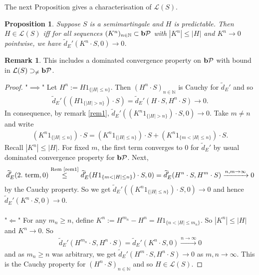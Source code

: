 \documentclass[12pt,a4paper, twoside]{article}
\newtheorem{prop}{Proposition}[section]
\theoremstyle{definition}
\newtheorem{rem}{Remark}[section]
\newcommand{\pred}{\textbf{\text{b}}\mathcal{P}}
\begin{document}
\newpage
The next Proposition gives a characterisation of $\mathcal{L}(S)$. 
\begin{prop} \label{P315} Suppose $S$ is a semimartingale and $H$ is predictable. Then $H \in \mathcal{L}(S)$ iff for all sequences $(K^n)_{n \in \mathbb{N}} \subset \pred$ with $|K^n| \leq |H|$ and $K^n \to 0$ pointwise, we have $\widetilde{d}_E'(K^n \cdot S,0) \to 0$. 
\end{prop}
\begin{rem} This includes a dominated convergence property on $\pred$ with bound in $\mathcal{L}(S) \supset_{\neq} \pred$. 
\end{rem}
\begin{proof}
"$\implies$" Let $H^n:= H 1_{\{ |H| \leq n\}}$. Then $(H^n \cdot S)_{n \in \mathbb{N}}$ is Cauchy for $\widetilde{d}_E'$ and so 
\begin{align*}
\widetilde{d}_E' ((H 1_{\{ |H| > n \}}) \cdot S) = \widetilde{d}_E' (H \cdot S, H^n  \cdot S) \to 0.
\end{align*}
In consequence, by remark \ref{rem1}, $\widetilde{d}_E'((K^n 1_{\{ | H| > n\}} ) \cdot S, 0) \to 0$. Take $m \neq n$ and write  
\begin{align*}
(K^n 1_{\{ |H| \leq n\}} ) \cdot S = (K^n 1_{\{ |H| \leq n\}}) \cdot S + (K^n 1_{\{ m < |H| \leq n \}}) \cdot S.
\end{align*}
Recall $|K^n| \leq |H|$. For fixed $m$, the first term converges to $0$ for $\tilde{d}_E'$ by usual dominated convergence property for $\pred$. Next, 
\begin{align*}
\widetilde{d}_E' ( 2. \text{ term},0) \overset{\text{Rem \ref{rem1}}}\leq \widetilde{d}_E' (H 1_{\{ m < |H| \leq n \}} ) \cdot S, 0) = \widetilde{d}_E' (H^n \cdot S, H^m \cdot S) \xrightarrow{n,m \to \infty} 0
\end{align*}
by the Cauchy property. So we get $\widetilde{d}_E'((K^n 1_{\{ |H| \leq n\}}) \cdot S, 0) \to 0$ and hence \\ $\widetilde{d}_E' (K^n \cdot S, 0) \to 0$.  \\
\\
"$\Longleftarrow$" For any $m_n \geq n$, define $K^n:= H^{m_n}-H^n= H 1_{\{ n < |H| \leq m_n\}}$. So $|K^n| \leq |H|$ and $K^n \to 0$. So   
\begin{align*}
\widetilde{d}_E' ( H^{m_n} \cdot S, H^n \cdot S) = \widetilde{d}_E' ( K^n \cdot S, 0 ) \xrightarrow{n \to \infty} 0
\end{align*}
and as $m_n \geq n$ was arbitrary, we get $\widetilde{d}_E'(H^m \cdot S, H^n \cdot S) \to 0$ as $m,n \to \infty$. This is the Cauchy property for $(H^n \cdot S)_{n \in \mathbb{N}}$ and so $H \in \mathcal{L}(S)$. 
\end{proof}
\end{document}
